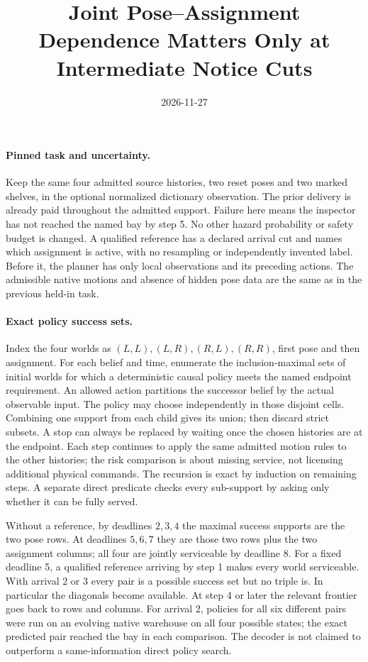 \documentclass{article}
\title{Joint Pose--Assignment Dependence Matters Only at Intermediate Notice Cuts}
\date{2026-11-27}
\begin{document}
\maketitle

\paragraph{Pinned task and uncertainty.}
Keep the same four admitted source histories, two reset poses
and two marked shelves, in the optional normalized dictionary
observation. The prior delivery is already paid throughout the
admitted support. Failure here means the inspector has not
reached the named bay by step 5. No other hazard probability or
safety budget is changed. A qualified reference has a declared
arrival cut and names which assignment is active, with no
resampling or independently invented label. Before it, the
planner has only local observations and its preceding actions.
The admissible native motions and absence of hidden pose data
are the same as in the previous held-in task.

\paragraph{Exact policy success sets.}
Index the four worlds as
\((L,L),(L,R),(R,L),(R,R)\), first pose and then assignment.
For each belief and time, enumerate the inclusion-maximal sets
of initial worlds for which a deterministic causal policy
meets the named endpoint requirement. An allowed action
partitions the successor belief by the actual observable
input. The policy may choose independently in those disjoint
cells. Combining one support from each child gives its union;
then discard strict subsets. A stop can always be replaced
by waiting once the chosen histories are at the endpoint.
Each step continues to apply the same admitted motion rules
to the other histories; the risk comparison is about missing
service, not licensing additional physical commands. The
recursion is exact by induction on remaining steps. A separate
direct predicate checks every sub-support by asking only
whether it can be fully served.

Without a reference, by deadlines \(2,3,4\) the maximal
success supports are the two pose rows. At deadlines
\(5,6,7\) they are those two rows plus the two assignment
columns; all four are jointly serviceable by deadline 8.
For a fixed deadline 5, a qualified reference arriving by step
1 makes every world serviceable. With arrival 2 or 3 every
pair is a possible success set but no triple is. In particular
the diagonals become available. At step 4 or later the
relevant frontier goes back to rows and columns.
For arrival 2, policies for all six different pairs were
run on an evolving native warehouse on all four possible
states; the exact predicted pair reached the bay in each
comparison. The decoder is not claimed to outperform a
same-information direct policy search.
\end{document}
